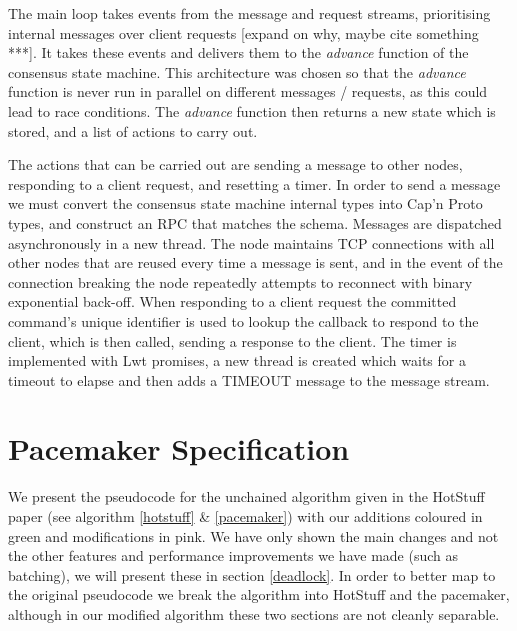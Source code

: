 The main loop takes events from the message and request streams, prioritising internal messages over client requests [expand on why, maybe cite something ***]. It takes these events and delivers them to the \textit{advance} function of the consensus state machine. This architecture was chosen so that the \textit{advance} function is never run in parallel on different messages / requests, as this could lead to race conditions. The \textit{advance} function then returns a new state which is stored, and a list of actions to carry out.

The actions that can be carried out are sending a message to other nodes, responding to a client request, and resetting a timer. In order to send a message we must convert the consensus state machine internal types into Cap'n Proto types, and construct an RPC that matches the schema. Messages are dispatched asynchronously in a new thread. The node maintains TCP connections with all other nodes that are reused every time a message is sent, and in the event of the connection breaking the node repeatedly attempts to reconnect with binary exponential back-off. When responding to a client request the committed command's unique identifier is used to lookup the callback to respond to the client, which is then called, sending a response to the client. The timer is implemented with Lwt promises, a new thread is created which waits for a timeout to elapse and then adds a TIMEOUT message to the message stream.

\section{Pacemaker Specification} \label{spec}
We present the pseudocode for the unchained algorithm given in the HotStuff paper (see algorithm \ref{hotstuff} \& \ref{pacemaker}) with our additions coloured in green and modifications in pink. We have only shown the main changes and not the other features and performance improvements we have made (such as batching), we will present these in section \ref{deadlock}. In order to better map to the original pseudocode we break the algorithm into HotStuff and the pacemaker, although in our modified algorithm these two sections are not cleanly separable.

